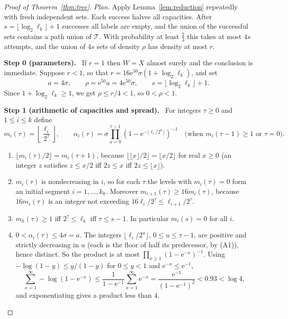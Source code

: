 \documentclass[11pt]{article}
\numberwithin{equation}{section}
\newcommand{\TT}{\mathcal T}
\newcommand{\ee}{\mathrm e}
\newcommand{\step}[2]{\par\medskip\noindent\textbf{Step #1 (#2).}\ }
\begin{document}
\begin{proof}[Proof of Theorem~\ref{thm:tree}]
\emph{Plan.} Apply Lemma~\ref{lem:reduction} repeatedly with fresh
independent sets. Each success halves all capacities. After
$s=\lfloor\log_2\ell_k\rfloor+1$ successes all labels are empty, and
the union of the successful sets contains a path union of $\TT$. With
probability at least $\frac23$ this takes at most $4s$ attempts, and
the union of $4s$ sets of density $\rho$ has density at most $r$.

\step{0}{parameters}
If $r=1$ then $W=X$ almost surely and the conclusion is immediate.
Suppose $r<1$, so that $r=16\ee^{50}\sigma(1+\log_2\ell_k)$, and set
\[
 a=4\sigma,\qquad \rho=\ee^{50}a=4\ee^{50}\sigma,
 \qquad s=\lfloor\log_2\ell_k\rfloor+1.
\]
Since $1+\log_2\ell_k\ge1$, we get
$\rho\le r/4<1$, so $0<\rho<1$.

\step{1}{arithmetic of capacities and spread}
For integers $\tau\ge0$ and $1\le i\le k$ define
\begin{equation}\label{eq:capacities}
 m_i(\tau)=\left\lfloor\frac{\ell_i}{2^\tau}\right\rfloor,
 \qquad
 \alpha_i(\tau)=\sigma
 \prod_{u=0}^{\tau-1}
 \left(1-\ee^{-\lfloor\ell_i/2^u\rfloor}\right)^{-1}
 \quad\text{(when $m_i(\tau-1)\ge1$ or $\tau=0$)}.
\end{equation}
\begin{enumerate}[label=(A\arabic*),leftmargin=2.8em,itemsep=2pt]
 \item $\lfloor m_i(\tau)/2\rfloor=m_i(\tau+1)$, because
 $\lfloor\lfloor x\rfloor/2\rfloor=\lfloor x/2\rfloor$ for real
 $x\ge0$ (an integer $z$ satisfies $z\le x/2$ iff $2z\le x$ iff
 $2z\le\lfloor x\rfloor$).
 \item $m_i(\tau)$ is nondecreasing in $i$, so for each $\tau$ the
 levels with $m_i(\tau)=0$ form an initial segment
 $i=1,\ldots,k_0$. Moreover $m_{i+1}(\tau)\ge16m_i(\tau)$, because
 $16m_i(\tau)$ is an integer not exceeding
 $16\ell_i/2^\tau\le\ell_{i+1}/2^\tau$.
 \item $m_k(\tau)\ge1$ iff $2^\tau\le\ell_k$ iff $\tau\le s-1$. In
 particular $m_i(s)=0$ for all $i$.
 \item $0<\alpha_i(\tau)\le4\sigma=a$. The integers
 $\lfloor\ell_i/2^u\rfloor$, $0\le u\le\tau-1$, are positive and
 strictly decreasing in $u$ (each is the floor of half its predecessor,
 by (A1)), hence distinct. So the product is at most
 $\prod_{x\ge1}(1-\ee^{-x})^{-1}$. Using
 $-\log(1-y)\le y/(1-y)$ for $0\le y<1$ and $\ee^{-x}\le\ee^{-1}$,
 \begin{equation}\label{eq:product}
 \sum_{x=1}^{\infty}-\log(1-\ee^{-x})
 \le \frac{1}{1-\ee^{-1}}\sum_{x=1}^{\infty}\ee^{-x}
 =\frac{\ee^{-1}}{(1-\ee^{-1})^2}<0.93<\log 4,
 \end{equation}
 and exponentiating gives a product less than $4$.
\end{enumerate}


\end{proof}
\end{document}
